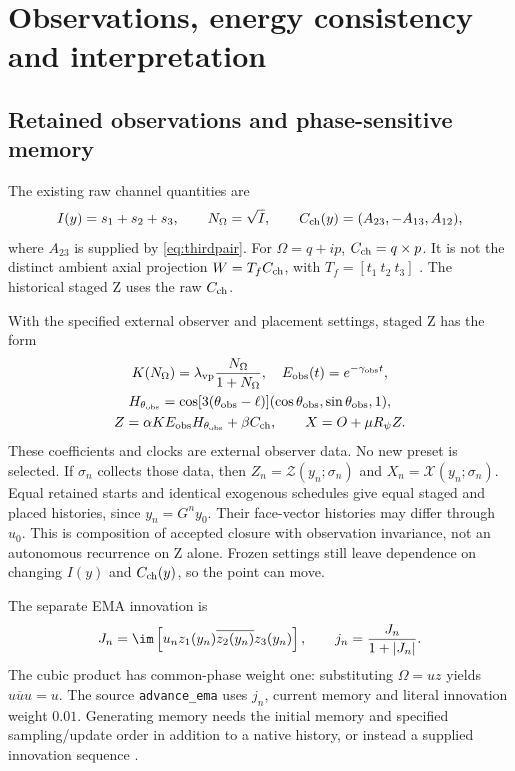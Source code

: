 \section{Observations, energy consistency and interpretation}\label{sec:observations}

\subsection{Retained observations and phase-sensitive memory}
The existing raw channel quantities are
\begin{equation}
I(y)=s_1+s_2+s_3,\qquad N_\Omega=\sqrt I,\qquad
C_{\rm ch}(y)=(A_{23},-A_{13},A_{12}),
\label{eq:rawobservations}
\end{equation}
where \(A_{23}\) is supplied by \eqref{eq:thirdpair}. For \(\Omega=q+ip\), \(C_{\rm ch}=q\times p\). It is not the distinct ambient axial projection \(W=T_fC_{\rm ch}\), with \(T_f=[t_1\ t_2\ t_3]\) \cite{nrg}. The historical staged Z uses the raw \(C_{\rm ch}\).

With the specified external observer and placement settings, staged Z has the form \cite[Section 3]{zmethods}
\begin{gather}
K(N_\Omega)=\lambda_{\rm vp}\frac{N_\Omega}{1+N_\Omega},\quad
E_{\rm obs}(t)=e^{-\gamma_{\rm obs}t},\notag\\
H_{\theta_{\rm obs}}=\cos[3(\theta_{\rm obs}-\ell)]
(\cos\theta_{\rm obs},\sin\theta_{\rm obs},1),\notag\\
Z=\alpha K E_{\rm obs}H_{\theta_{\rm obs}}+\beta C_{\rm ch},
\qquad X=O+\mu R_\psi Z.
\label{eq:staged}
\end{gather}
These coefficients and clocks are external observer data. No new preset is selected. If \(\sigma_n\) collects those data, then \(Z_n=\mathcal Z(y_n;\sigma_n)\) and \(X_n=\mathcal X(y_n;\sigma_n)\). Equal retained starts and identical exogenous schedules give equal staged and placed histories, since \(y_n=G^ny_0\). Their face-vector histories may differ through \(u_0\). This is composition of accepted closure with observation invariance, not an autonomous recurrence on Z alone. Frozen settings still leave dependence on changing \(I(y)\) and \(C_{\rm ch}(y)\), so the point can move.

The separate EMA innovation is
\begin{equation}
J_n=\im\left[u_nz_1(y_n)\overline{z_2(y_n)}z_3(y_n)\right],
\qquad j_n=\frac{J_n}{1+|J_n|}.
\label{eq:innovation}
\end{equation}
The cubic product has common-phase weight one: substituting \(\Omega=uz\) yields \(u\overline u u=u\). The source \texttt{advance\_ema} uses \(j_n\), current memory and literal innovation weight \(0.01\). Generating memory needs the initial memory and specified sampling/update order in addition to a native history, or instead a supplied innovation sequence \cite{zcode}.

